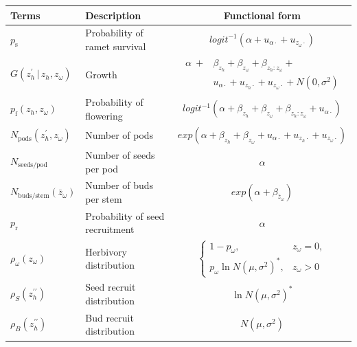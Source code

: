 \documentclass[10pt]{article}
\begin{document}
\begin{framed}
\centering
\begin{tabular}{ |l|l|c| }
\hline
\rowcolor{mygray} 
Terms & Description & Functional form \\ \hline
$p_{\mathrm{s}}$ & Probability of ramet survival & $logit^{-1}(\alpha + u_{\alpha\cdot} + u_{z_{\omega}\cdot})$ \\
$G(z_{h}^{\prime}\, | \, z_{h},z_{\omega})$ & Growth & $\begin{array}{ll}\alpha \ + & \!\!\!\beta_{z_{h}} + \beta_{z_{\omega}} + \beta_{z_{h}:z_{\omega}} + \\ & \!\!\!u_{\alpha\cdot} + u_{z_{h}\cdot} + u_{z_{\omega}\cdot} + N(0,\sigma^2)\end{array}$ \\
$p_{\mathrm{f}}(z_{h},z_{\omega})$ & Probability of flowering & $logit^{-1}(\alpha + \beta_{z_{h}} + \beta_{z_{\omega}} + \beta_{z_{h}:z_{\omega}} + u_{\alpha\cdot})$ \\ 
$N_{\mathrm{pods}}\left(z_{h}^{\prime},z_{\omega}\right)$ & Number of pods & $exp(\alpha + \beta_{z_{h}} + \beta_{z_{\omega}} + u_{\alpha\cdot} + u_{z_{h}\cdot} + u_{z_{\omega}\cdot})$ \\ 
$N_{\mathrm{seeds/pod}}$ & Number of seeds per pod & $\alpha$ \\
$N_{\mathrm{buds/stem}}(\bar{z}_{\omega})$ & Number of buds per stem & $exp(\alpha + \beta_{\bar{z}_{\omega}})$ \\ 
$p_{\mathrm{r}}$ & Probability of seed recruitment & $\alpha$ \\
$\rho_{\omega}(z_{\omega})$ & Herbivory distribution & $\left\{\begin{array}{ll}1-p_{\omega}, & z_{\omega} = 0, \\ p_{\omega}\ln N(\mu, \sigma^2)^{*}, & z_{\omega} > 0\end{array}\right.$ \\
$\rho_{S}(z_{h}^{\prime\prime})$ & Seed recruit distribution & $\ln N(\mu, \sigma^2)^{*}$ \\
$\rho_{B}(z_{h}^{\prime\prime})$ & Bud recruit distribution & $N(\mu, \sigma^2)$ \\
\hline
\end{tabular}

\end{framed}
\end{document}
